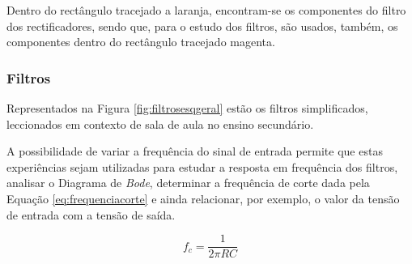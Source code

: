 Dentro do rectângulo tracejado a laranja, encontram-se os componentes do filtro dos rectificadores, sendo que, para o estudo dos filtros, são usados, também, os componentes dentro do rectângulo tracejado magenta.

\subsubsection{Filtros}
\label{sec:filtros}
Representados na Figura \ref{fig:filtrosesqgeral} estão os filtros simplificados, leccionados em contexto de sala de aula no ensino secundário.

A possibilidade de variar a frequência do sinal de entrada permite que estas experiências sejam utilizadas para estudar a resposta em frequência dos filtros, analisar o Diagrama de \textit{Bode}, determinar a frequência de corte dada pela Equação \ref{eq:frequenciacorte} e ainda relacionar, por exemplo, o valor da tensão de entrada com a tensão de saída. 

\begin{equation} \label{eq:frequenciacorte}
	f_{c} = \frac{1}{2\pi RC}
\end{equation}

